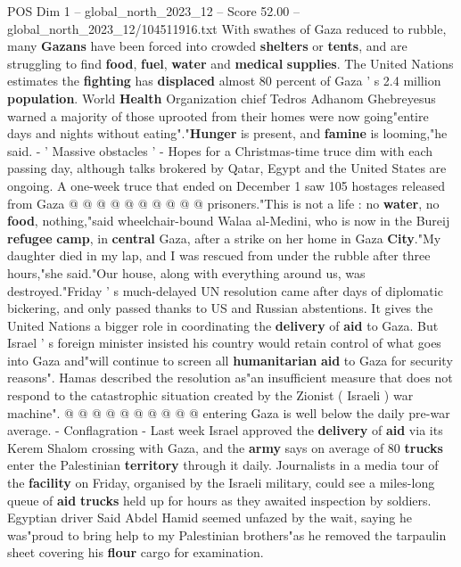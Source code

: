 \begin{textsample}{POS Dim 1 – global\_north\_2023\_12 – Score 52.00 – global\_north\_2023\_12/104511916.txt}
With swathes of Gaza reduced to rubble, many \textbf{Gazans} have been forced into crowded \textbf{shelters} or \textbf{tents}, and are struggling to find \textbf{food}, \textbf{fuel}, \textbf{water} and \textbf{medical} \textbf{supplies}.
The United Nations estimates the \textbf{fighting} has \textbf{displaced} almost 80 percent of Gaza ' s 2.4 million \textbf{population}.
World \textbf{Health} Organization chief Tedros Adhanom Ghebreyesus warned a majority of those uprooted from their homes were now going"entire days and nights without eating"."\textbf{Hunger} is present, and \textbf{famine} is looming,"he said. - ' Massive obstacles ' - Hopes for a Christmas-time truce dim with each passing day, although talks brokered by Qatar, Egypt and the United States are ongoing.
A one-week truce that ended on December 1 saw 105 hostages released from Gaza @ @ @ @ @ @ @ @ @ @ prisoners."This is not a life : no \textbf{water}, no \textbf{food}, nothing,"said wheelchair-bound Walaa al-Medini, who is now in the Bureij \textbf{refugee} \textbf{camp}, in \textbf{central} Gaza, after a strike on her home in Gaza \textbf{City}."My daughter died in my lap, and I was rescued from under the rubble after three hours,"she said."Our house, along with everything around us, was destroyed."Friday ' s much-delayed UN resolution came after days of diplomatic bickering, and only passed thanks to US and Russian abstentions.
It gives the United Nations a bigger role in coordinating the \textbf{delivery} of \textbf{aid} to Gaza.
But Israel ' s foreign minister insisted his country would retain control of what goes into Gaza and"will continue to screen all \textbf{humanitarian} \textbf{aid} to Gaza for security reasons".
Hamas described the resolution as"an insufficient measure that does not respond to the catastrophic situation created by the Zionist ( Israeli ) war machine". @ @ @ @ @ @ @ @ @ @ entering Gaza is well below the daily pre-war average. - Conflagration - Last week Israel approved the \textbf{delivery} of \textbf{aid} via its Kerem Shalom crossing with Gaza, and the \textbf{army} says on average of 80 \textbf{trucks} enter the Palestinian \textbf{territory} through it daily.
Journalists in a media tour of the \textbf{facility} on Friday, organised by the Israeli military, could see a miles-long queue of \textbf{aid} \textbf{trucks} held up for hours as they awaited inspection by soldiers.
Egyptian driver Said Abdel Hamid seemed unfazed by the wait, saying he was"proud to bring help to my Palestinian brothers"as he removed the tarpaulin sheet covering his \textbf{flour} cargo for examination.

\end{textsample}
